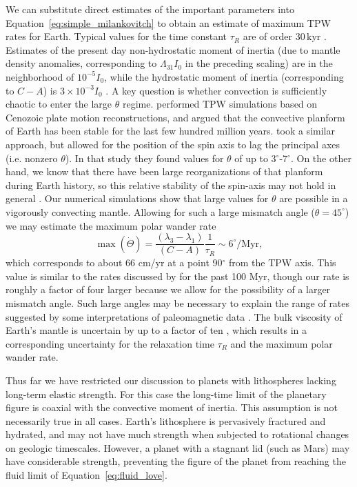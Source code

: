 \documentclass[preprint,12pt,authoryear]{elsarticle}
\begin{document}
We can substitute direct estimates of the important parameters into Equation~\eqref{eq:simple_milankovitch} to obtain an estimate of maximum TPW rates for Earth.
Typical values for the time constant $\tau_R$ are of order $30 \, \mathrm{kyr}$ \citep{ricard1993polar}.
Estimates of the present day non-hydrostatic moment of inertia (due to mantle density anomalies, corresponding to $\Lambda_{31}I_0$ in the preceding scaling)
are in the neighborhood of $10^{-5} I_0$, while the hydrostatic moment of inertia (corresponding to $C-A$) is $3 \times 10^{-3} I_0$ \citep{chambat2001mean}.
A key question is whether convection is sufficiently chaotic to enter the large $\theta$ regime. 
\citet{richards1997explanation} performed TPW simulations based on Cenozoic plate motion reconstructions, and argued that the convective planform of Earth has been stable for the last few hundred million years. 
\citet{cambiotti2011new} took a similar approach, but allowed for the position of the spin axis to lag the principal axes (i.e. nonzero $\theta$). In that study they found values for $\theta$ of up to 3$^\circ$-7$^\circ$.
On the other hand, we know that there have been large reorganizations of that planform during Earth history,
so this relative stability of the spin-axis may not hold in general \citep{evans2003true}.
Our numerical simulations show that large values for $\theta$ are possible in a vigorously convecting mantle.
Allowing for such a large mismatch angle ($\theta = 45^\circ$) we may estimate the maximum polar wander rate
\begin{equation}
\max ( \dot{\Theta} ) = \frac{(\lambda_3-\lambda_1)}{(C-A)}\frac{1}{\tau_R} \sim 6^\circ / \mathrm{Myr},
\end{equation}
which corresponds to about 66 cm/yr at a point 90$^\circ$ from the TPW axis.
This value is similar to the rates discussed by \citet{cambiotti2011new} for the past 100 Myr, though our rate is roughly a factor of four larger because we allow for the
possibility of a larger mismatch angle. Such large angles may be necessary to explain the range of rates suggested by some interpretations of paleomagnetic data \citep{mitchell2011sutton}.
The bulk viscosity of Earth's mantle is uncertain by up to a factor of ten \citep{mitrovica2004new},
which results in a corresponding uncertainty for the relaxation time $\tau_R$ and the maximum polar wander rate.

Thus far we have restricted our discussion to planets with lithospheres lacking long-term elastic strength.
For this case the long-time limit of the planetary figure is coaxial with the convective 
moment of inertia. This assumption is not necessarily true in all cases.
Earth's lithosphere is pervasively fractured and hydrated, and may not have much strength when subjected to rotational changes on geologic timescales.
However, a planet with a stagnant lid (such as Mars) may have considerable strength, preventing the figure of the planet 
from reaching the fluid limit of Equation~\eqref{eq:fluid_love}.
\end{document}
